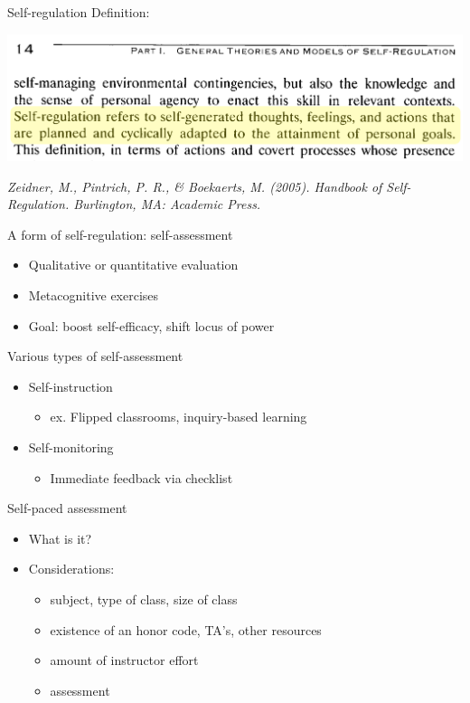 \documentclass{beamer}
\begin{document}
\begin{frame}{Self-regulation}
  Definition:
  \begin{center}
    \includegraphics[scale=0.4]{selfregdef}
  \end{center}
  \hfill \begin{minipage}[]{7cm}
      \emph{\tiny Zeidner, M., Pintrich, P. R., \& Boekaerts, M. (2005). Handbook of Self-Regulation. Burlington, MA: Academic Press.}
\end{minipage}
\end{frame}
\begin{frame}{A form of self-regulation: self-assessment}
  \begin{itemize}
    \item Qualitative or quantitative evaluation
    \item Metacognitive exercises
    \item Goal: boost self-efficacy, shift locus of power
  \end{itemize}
\end{frame}
\begin{frame}{Various types of self-assessment}
  \begin{itemize}
    \item Self-instruction
    \begin{itemize}
      \item ex. Flipped classrooms, inquiry-based learning
    \end{itemize}
    \item Self-monitoring
    \begin{itemize}
      \item Immediate feedback via checklist
    \end{itemize}
  \end{itemize}
\end{frame}
\begin{frame}{Self-paced assessment}
  \begin{itemize}
    \item What is it?\pause
    \item Considerations:
    \begin{itemize}
      \item subject, type of class, size of class
      \item existence of an honor code, TA's, other resources
      \item amount of instructor effort
      \item assessment
    \end{itemize}
  \end{itemize}
\end{frame}
\end{document}
